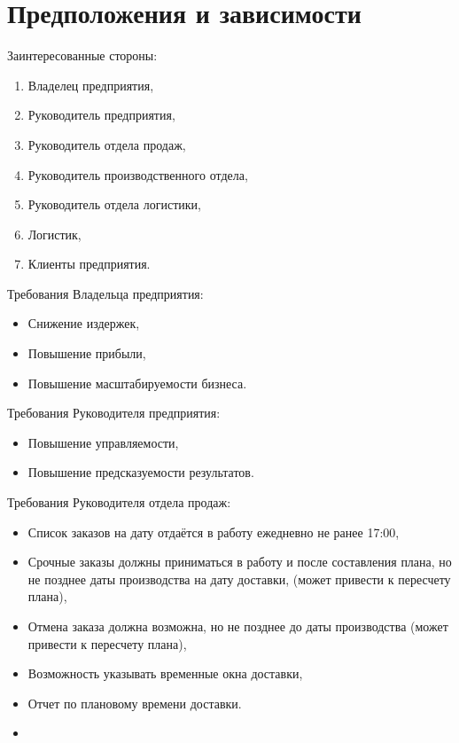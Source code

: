 \section{Предположения и зависимости}
\label{sec:dep}

Заинтересованные стороны:
\begin{enumerate}
    \item Владелец предприятия,
    \item Руководитель предприятия,
    \item Руководитель отдела продаж,
    \item Руководитель производственного отдела,
    \item Руководитель отдела логистики,
    \item Логистик,
    \item Клиенты предприятия.
\end{enumerate}

Требования Владельца предприятия:
\begin{itemize}
    \item Снижение издержек,
    \item Повышение прибыли,
    \item Повышение масштабируемости бизнеса.
\end{itemize}

Требования Руководителя предприятия:
\begin{itemize}
    \item Повышение управляемости,
    \item Повышение предсказуемости результатов.
\end{itemize}

Требования Руководителя отдела продаж:
\begin{itemize}
    \item Список заказов на дату отдаётся в работу ежедневно не ранее 17:00,
    \item Срочные заказы должны приниматься в работу и после составления плана, но не позднее даты производства на дату доставки, (может привести к пересчету плана),
    \item Отмена заказа должна возможна, но не позднее до даты производства (может привести к пересчету плана),
    \item Возможность указывать временные окна доставки,
    \item Отчет по плановому времени доставки.
\item \end{itemize}

